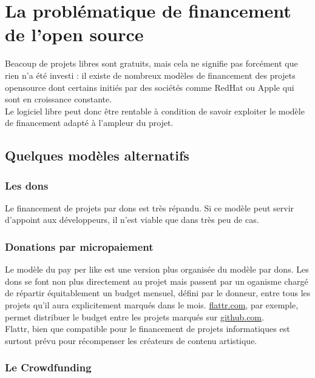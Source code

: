 \chapter{La problématique de financement de l'open source}

Beacoup de projets libres sont gratuits, mais cela ne signifie pas forcément
que rien n'a été investi : il existe de nombreux modèles de financement des
projets opensource dont certains initiés par des sociétés comme RedHat ou Apple
qui sont en croissance constante.\\ Le logiciel libre peut donc être rentable à
condition de savoir exploiter le modèle de financement adapté à l'ampleur du
projet.

\section{Quelques modèles alternatifs}

    \subsection{Les dons}

Le financement de projets par dons est très répandu.  Si ce modèle peut servir
d'appoint aux développeurs, il n'est viable que dans très peu de cas.
    
    \subsection{Donations par micropaiement}

Le modèle du pay per like est une version plus organisée du modèle par dons.
Les dons se font non plus directement au projet mais passent par un oganisme
chargé de répartir équitablement un budget mensuel, défini par le donneur,
entre tous les projets qu'il aura explicitement marqués dans le mois.
\url{flattr.com}, par exemple, permet distribuer le budget entre les projets
marqués sur \url{github.com}.\\ Flattr, bien que compatible pour le financement
de projets informatiques est surtout prévu pour récompenser les créateurs de
contenu artistique.
    
    \subsection{Le Crowdfunding}

